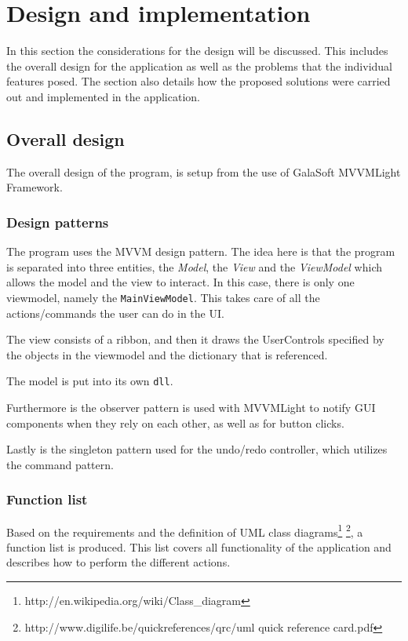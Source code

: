\section{Design and implementation}

In this section the considerations for the
design will be discussed. This includes the overall design for the application
as well as the problems that the individual features posed. The section also
details how the proposed solutions were carried out and implemented in the
application.

\subsection{Overall design}
The overall design of the program, is setup from the use of GalaSoft MVVMLight
Framework.

\subsubsection{Design patterns}

The program uses the MVVM design pattern. The idea here is that the program is
separated into three entities, the \textit{Model}, the \textit{View} and the
\textit{ViewModel} which allows the model and the view to interact.
In this case, there is only one
viewmodel, namely the \texttt{MainViewModel}. This takes care of all the actions/commands
the user can do in the UI.

The view consists of a ribbon, and then it draws the UserControls specified by
the objects in the viewmodel and the dictionary that is referenced.

The model is put into its own \texttt{dll}.

Furthermore is the observer pattern is used with MVVMLight to notify GUI components 
when they rely on each other, as well as for button clicks.

Lastly is the singleton pattern used for the undo/redo controller, which
utilizes the command pattern.

\subsubsection{Function list}
Based on the requirements and the definition of UML class 
diagrams\footnote{http://en.wikipedia.org/wiki/Class\_diagram} 
\footnote{http://www.digilife.be/quickreferences/qrc/uml quick reference 
card.pdf}, a function list is produced. This list covers all functionality of 
the application and describes how to perform the different actions.

